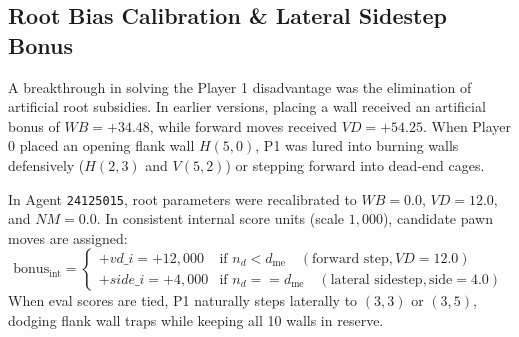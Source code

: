 \subsection{Root Bias Calibration \& Lateral Sidestep Bonus}
A breakthrough in solving the Player 1 disadvantage was the elimination of artificial root subsidies. In earlier versions, placing a wall received an artificial bonus of $WB = +34.48$, while forward moves received $VD = +54.25$. When Player 0 placed an opening flank wall $H(5,0)$, P1 was lured into burning walls defensively ($H(2,3)$ and $V(5,2)$) or stepping forward into dead-end cages.

In Agent \texttt{24125015}, root parameters were recalibrated to $WB = 0.0$, $VD = 12.0$, and $NM = 0.0$. In consistent internal score units (scale $1{,}000$), candidate pawn moves are assigned:
\begin{equation}
    \text{bonus}_{\text{int}} = \begin{cases}
        +vd\_i = +12{,}000 & \text{if } n_d < d_{\text{me}} \quad (\text{forward step}, VD = 12.0) \\
        +side\_i = +4{,}000 & \text{if } n_d == d_{\text{me}} \quad (\text{lateral sidestep}, \text{side} = 4.0)
    \end{cases}
\end{equation}
When eval scores are tied, P1 naturally steps laterally to $(3,3)$ or $(3,5)$, dodging flank wall traps while keeping all 10 walls in reserve.

